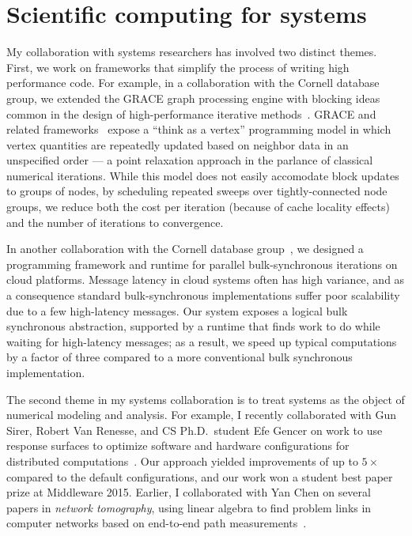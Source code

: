 \documentclass[11pt]{amsart}
\begin{document}
\section{Scientific computing for systems}
\label{sec-sc-systems}

My collaboration with systems researchers has involved two distinct
themes. First, we work on frameworks that simplify the process of
writing high performance code.  For example, in a collaboration with the
Cornell database group, we extended the GRACE graph processing engine
with blocking ideas common in the design of high-performance iterative
methods~\cite{2013-blockgrace}.  GRACE and related
frameworks~\cite{Low:2010:GraphLab,Kyrola:2012:GLG,Malewicz:2010:PSL}
expose a ``think as a vertex'' programming model in which vertex
quantities are repeatedly updated based on neighbor data in an
unspecified order --- a point relaxation approach in the parlance
of classical numerical iterations.  While this model does not easily
accomodate block updates to groups of nodes,
by scheduling repeated sweeps over tightly-connected node groups,
we reduce both the cost per iteration (because of cache locality effects)
and the number of iterations to convergence.

In another collaboration with the Cornell database
group~\cite{2011-socc}, we designed a programming framework and runtime
for parallel bulk-synchronous iterations on cloud platforms.
Message latency in cloud systems often has high variance, and as a
consequence standard bulk-synchronous implementations suffer poor
scalability due to a few high-latency messages.  Our system exposes
a logical bulk synchronous abstraction, supported by a runtime that
finds work to do while waiting for high-latency messages; as a result,
we speed up typical computations by a factor of three compared to a more
conventional bulk synchronous implementation.


The second theme in my systems collaboration is to treat systems as the
object of numerical modeling and analysis. For example, I recently
collaborated with Gun Sirer, Robert Van Renesse, and CS Ph.D.~student
Efe Gencer on work to use response surfaces to optimize software and
hardware configurations for distributed
computations~\cite{2015-middleware}.  Our approach yielded improvements
of up to $5 \times$ compared to the default configurations, and our
work won a student best paper prize at Middleware 2015.  Earlier, I
collaborated with Yan Chen on several papers in {\em network
tomography}, using linear algebra to find problem links in computer
networks based on end-to-end path
measurements~\cite{2009-tons,2007-tons,2006-sigcomm,2006-sigmetrics,2004-sigcomm,2003-imc}.
\end{document}
